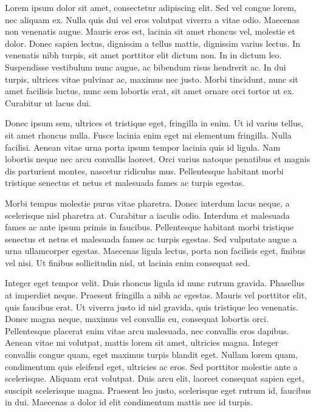 

\begin{acknowledgements}      

  Lorem ipsum dolor sit amet, consectetur adipiscing elit. Sed vel congue lorem, nec aliquam ex. Nulla quis dui vel eros volutpat viverra a vitae odio. Maecenas non venenatis augue. Mauris eros est, lacinia sit amet rhoncus vel, molestie et dolor. Donec sapien lectus, dignissim a tellus mattis, dignissim varius lectus. In venenatis nibh turpis, sit amet porttitor elit dictum non. In in dictum leo. Suspendisse vestibulum nunc augue, ac bibendum risus hendrerit ac. In dui turpis, ultrices vitae pulvinar ac, maximus nec justo. Morbi tincidunt, nunc sit amet facilisis luctus, nunc sem lobortis erat, sit amet ornare orci tortor ut ex. Curabitur ut lacus dui.

  Donec ipsum sem, ultrices et tristique eget, fringilla in enim. Ut id varius tellus, sit amet rhoncus nulla. Fusce lacinia enim eget mi elementum fringilla. Nulla facilisi. Aenean vitae urna porta ipsum tempor lacinia quis id ligula. Nam lobortis neque nec arcu convallis laoreet. Orci varius natoque penatibus et magnis dis parturient montes, nascetur ridiculus mus. Pellentesque habitant morbi tristique senectus et netus et malesuada fames ac turpis egestas.
  
  Morbi tempus molestie purus vitae pharetra. Donec interdum lacus neque, a scelerisque nisl pharetra at. Curabitur a iaculis odio. Interdum et malesuada fames ac ante ipsum primis in faucibus. Pellentesque habitant morbi tristique senectus et netus et malesuada fames ac turpis egestas. Sed vulputate augue a urna ullamcorper egestas. Maecenas ligula lectus, porta non facilisis eget, finibus vel nisi. Ut finibus sollicitudin nisl, ut lacinia enim consequat sed.
  
  Integer eget tempor velit. Duis rhoncus ligula id nunc rutrum gravida. Phasellus at imperdiet neque. Praesent fringilla a nibh ac egestas. Mauris vel porttitor elit, quis faucibus erat. Ut viverra justo id nisl gravida, quis tristique leo venenatis. Donec magna neque, maximus vel convallis eu, consequat lobortis orci. Pellentesque placerat enim vitae arcu malesuada, nec convallis eros dapibus. Aenean vitae mi volutpat, mattis lorem sit amet, ultricies magna. Integer convallis congue quam, eget maximus turpis blandit eget. Nullam lorem quam, condimentum quis eleifend eget, ultricies ac eros. Sed porttitor molestie ante a scelerisque. Aliquam erat volutpat. Duis arcu elit, laoreet consequat sapien eget, suscipit scelerisque magna. Praesent leo justo, scelerisque eget rutrum id, faucibus in dui. Maecenas a dolor id elit condimentum mattis nec id turpis.
  
\end{acknowledgements}
